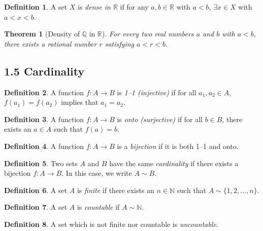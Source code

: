 \documentclass[11pt]{amsart}
\newtheorem*{theorem}{Theorem}
\theoremstyle{definition}
\newtheorem*{definition}{Definition}
\newcommand{\N}{\mathbb{N}}
\newcommand{\Q}{\mathbb{Q}}
\newcommand{\R}{\mathbb{R}}
\begin{document}
\begin{definition}
  A set $X$ is \emph{dense in $\R$} if for any $a, b \in \R$ with $a < b$,
  $\exists x \in X$ with $a < x < b$.
\end{definition}

\begin{theorem}[Density of $\Q$ in $\R$]
  For every two real numbers $a$ and $b$ with $a < b$, there exists a rational
  number $r$ satisfying $a < r < b$.
\end{theorem}

\subsection*{1.5 Cardinality}

\begin{definition}
  A function $f : A \rightarrow B$ is \emph{1--1 (injective)} if for all $a_1,
  a_2 \in A$, $f(a_1) = f(a_2)$ implies that $a_1 = a_2$.
\end{definition}

\begin{definition}
  A function $f : A \rightarrow B$ is \emph{onto (surjective)} if for all $b
  \in B$, there exists an $a \in A$ such that $f(a) = b$.
\end{definition}

\begin{definition}
  A function $f : A \rightarrow B$ is a \emph{bijection} if it is both 1--1 and
  onto.
\end{definition}

\begin{definition}
  Two sets $A$ and $B$ have the same \emph{cardinality} if there exists a
  bijection $f : A \rightarrow B$. In this case, we write $A \sim B$.
\end{definition}

\begin{definition}
  A set $A$ is \emph{finite} if there exists an $n \in \N$ such that $A \sim
  \{1, 2, \ldots, n\}$.
\end{definition}

\begin{definition}
  A set $A$ is \emph{countable} if $A \sim \N$.
\end{definition}

\begin{definition}
  A set which is not finite nor countable is \emph{uncountable}.
\end{definition}
\end{document}
